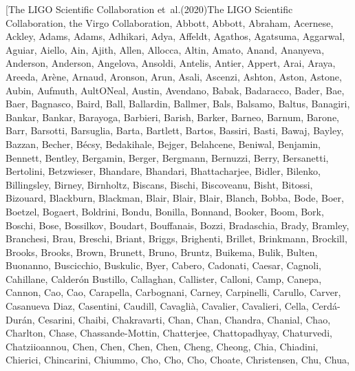 \documentclass[times,tight]{aastex631}
\begin{document}
\begin{thebibliography}{}
\bibitem[{{The LIGO Scientific Collaboration} {et~al.}(2020){The LIGO
  Scientific Collaboration}, {the Virgo Collaboration}, {Abbott}, {Abbott},
  {Abraham}, {Acernese}, {Ackley}, {Adams}, {Adams}, {Adhikari}, {Adya},
  {Affeldt}, {Agathos}, {Agatsuma}, {Aggarwal}, {Aguiar}, {Aiello}, {Ain},
  {Ajith}, {Allen}, {Allocca}, {Altin}, {Amato}, {Anand}, {Ananyeva},
  {Anderson}, {Anderson}, {Angelova}, {Ansoldi}, {Antelis}, {Antier}, {Appert},
  {Arai}, {Araya}, {Areeda}, {Ar{\`e}ne}, {Arnaud}, {Aronson}, {Arun}, {Asali},
  {Ascenzi}, {Ashton}, {Aston}, {Astone}, {Aubin}, {Aufmuth}, {AultONeal},
  {Austin}, {Avendano}, {Babak}, {Badaracco}, {Bader}, {Bae}, {Baer},
  {Bagnasco}, {Baird}, {Ball}, {Ballardin}, {Ballmer}, {Bals}, {Balsamo},
  {Baltus}, {Banagiri}, {Bankar}, {Bankar}, {Barayoga}, {Barbieri}, {Barish},
  {Barker}, {Barneo}, {Barnum}, {Barone}, {Barr}, {Barsotti}, {Barsuglia},
  {Barta}, {Bartlett}, {Bartos}, {Bassiri}, {Basti}, {Bawaj}, {Bayley},
  {Bazzan}, {Becher}, {B{\'e}csy}, {Bedakihale}, {Bejger}, {Belahcene},
  {Beniwal}, {Benjamin}, {Bennett}, {Bentley}, {Bergamin}, {Berger},
  {Bergmann}, {Bernuzzi}, {Berry}, {Bersanetti}, {Bertolini}, {Betzwieser},
  {Bhandare}, {Bhandari}, {Bhattacharjee}, {Bidler}, {Bilenko}, {Billingsley},
  {Birney}, {Birnholtz}, {Biscans}, {Bischi}, {Biscoveanu}, {Bisht}, {Bitossi},
  {Bizouard}, {Blackburn}, {Blackman}, {Blair}, {Blair}, {Blair}, {Blanch},
  {Bobba}, {Bode}, {Boer}, {Boetzel}, {Bogaert}, {Boldrini}, {Bondu},
  {Bonilla}, {Bonnand}, {Booker}, {Boom}, {Bork}, {Boschi}, {Bose},
  {Bossilkov}, {Boudart}, {Bouffanais}, {Bozzi}, {Bradaschia}, {Brady},
  {Bramley}, {Branchesi}, {Brau}, {Breschi}, {Briant}, {Briggs}, {Brighenti},
  {Brillet}, {Brinkmann}, {Brockill}, {Brooks}, {Brooks}, {Brown}, {Brunett},
  {Bruno}, {Bruntz}, {Buikema}, {Bulik}, {Bulten}, {Buonanno}, {Buscicchio},
  {Buskulic}, {Byer}, {Cabero}, {Cadonati}, {Caesar}, {Cagnoli}, {Cahillane},
  {Calder{\'o}n Bustillo}, {Callaghan}, {Callister}, {Calloni}, {Camp},
  {Canepa}, {Cannon}, {Cao}, {Cao}, {Carapella}, {Carbognani}, {Carney},
  {Carpinelli}, {Carullo}, {Carver}, {Casanueva Diaz}, {Casentini}, {Caudill},
  {Cavagli{\`a}}, {Cavalier}, {Cavalieri}, {Cella}, {Cerd{\'a}-Dur{\'a}n},
  {Cesarini}, {Chaibi}, {Chakravarti}, {Chan}, {Chan}, {Chandra}, {Chanial},
  {Chao}, {Charlton}, {Chase}, {Chassande-Mottin}, {Chatterjee},
  {Chattopadhyay}, {Chaturvedi}, {Chatziioannou}, {Chen}, {Chen}, {Chen},
  {Chen}, {Cheng}, {Cheong}, {Chia}, {Chiadini}, {Chierici}, {Chincarini},
  {Chiummo}, {Cho}, {Cho}, {Cho}, {Choate}, {Christensen}, {Chu}, {Chua},
}
\end{thebibliography}
\end{document}
